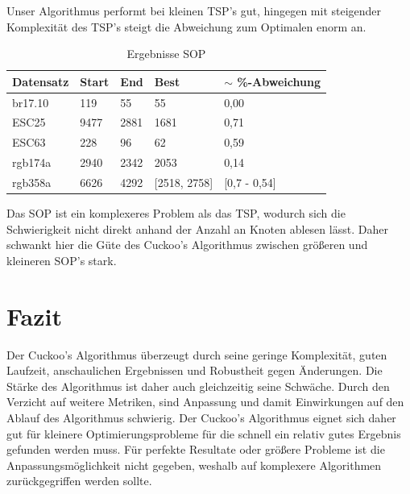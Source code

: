 \documentclass[conference]{IEEEtran}
\begin{document}
      Unser Algorithmus performt bei kleinen TSP's gut, hingegen mit steigender Komplexität des TSP's steigt die Abweichung zum Optimalen enorm an. 
    

      \begin{table}[h]
        \label{table:SOP}
        \centering
        \begin{tabular}{|l|ll|l|l|}
        \hline
            Datensatz & \multicolumn{1}{l|}{Start} & End  & Best & $\sim$ \%-Abweichung \\ \hline
            br17.10  & \multicolumn{1}{l|}{119} & 55 & 55 & 0,00       \\ \hline
            ESC25  & \multicolumn{1}{l|}{9477} & 2881 & 1681 & 0,71       \\ \hline
            ESC63  & \multicolumn{1}{l|}{228} & 96 & 62 & 0,59       \\ \hline
            rgb174a  & \multicolumn{1}{l|}{2940} & 2342 & 2053 & 0,14       \\ \hline
            rgb358a  & \multicolumn{1}{l|}{6626} & 4292 & [2518, 2758] & [0,7 - 0,54]       \\ \hline
        \end{tabular}
        \caption{Ergebnisse SOP}
      \end{table}

      Das SOP ist ein komplexeres Problem als das TSP, wodurch sich die Schwierigkeit nicht direkt anhand der Anzahl an Knoten ablesen lässt.
      Daher schwankt hier die Güte des Cuckoo's Algorithmus zwischen größeren und kleineren SOP's stark. 

  \section{Fazit}
    Der Cuckoo's Algorithmus überzeugt durch seine geringe Komplexität, 
    guten Laufzeit, anschaulichen Ergebnissen und Robustheit gegen Änderungen. 
    Die Stärke des Algorithmus ist daher auch gleichzeitig seine Schwäche. Durch den Verzicht 
    auf weitere Metriken, sind Anpassung und damit Einwirkungen auf den Ablauf des Algorithmus schwierig. 
    Der Cuckoo's Algorithmus eignet sich daher gut für kleinere Optimierungsprobleme für die schnell ein relativ 
    gutes Ergebnis gefunden werden muss. Für perfekte Resultate oder größere Probleme ist die Anpassungsmöglichkeit 
    nicht gegeben, weshalb auf komplexere Algorithmen zurückgegriffen werden sollte. 
\end{document}
